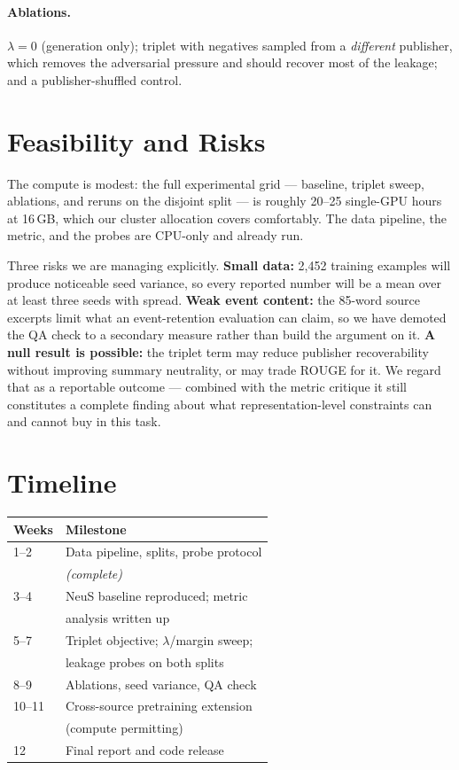 \documentclass[10pt,twocolumn,a4paper]{article}
\begin{document}
\paragraph{Ablations.} $\lambda = 0$ (generation only); triplet with negatives
sampled from a \emph{different} publisher, which removes the adversarial pressure
and should recover most of the leakage; and a publisher-shuffled control.

\section{Feasibility and Risks}

The compute is modest: the full experimental grid --- baseline, triplet sweep,
ablations, and reruns on the disjoint split --- is roughly 20--25 single-GPU
hours at 16\,GB, which our cluster allocation covers comfortably. The data
pipeline, the metric, and the probes are CPU-only and already run.

Three risks we are managing explicitly. \textbf{Small data:} 2{,}452 training
examples will produce noticeable seed variance, so every reported number will be
a mean over at least three seeds with spread. \textbf{Weak event content:} the
85-word source excerpts limit what an event-retention evaluation can claim, so we
have demoted the QA check to a secondary measure rather than build the argument
on it. \textbf{A null result is possible:} the triplet term may reduce publisher
recoverability without improving summary neutrality, or may trade ROUGE for it.
We regard that as a reportable outcome --- combined with the metric critique it
still constitutes a complete finding about what representation-level constraints
can and cannot buy in this task.

\section{Timeline}

\begin{tabular}{@{}ll@{}}
\toprule
\textbf{Weeks} & \textbf{Milestone} \\
\midrule
1--2 & Data pipeline, splits, probe protocol \\
     & \emph{(complete)} \\
3--4 & NeuS baseline reproduced; metric \\
     & analysis written up \\
5--7 & Triplet objective; $\lambda$/margin sweep; \\
     & leakage probes on both splits \\
8--9 & Ablations, seed variance, QA check \\
10--11 & Cross-source pretraining extension \\
       & (compute permitting) \\
12 & Final report and code release \\
\bottomrule
\end{tabular}
\end{document}
